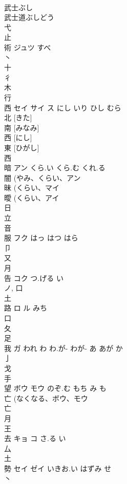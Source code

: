 \documentclass[8pt]{extreport}
\begin{document}
\begin{CJK}{UTF8}{min}
\\	武士ぶし
\\	武士道ぶしどう
\\	弋 
\\	止 
\\	術	ジュツ	すべ	
\\	丶 
\\	十 
\\	彳 
\\	木 
\\	行 
\\	西	セイ サイ ス	にし いり ひし むら	
\\	北 [きた] 
\\	南 [みなみ] 
\\	西 [にし] 
\\	東 [ひがし] 
\\	西 
\\	暗	アン	くら.い くら.む くれ.る	
\\	闇 (やみ、くらい、アン 
\\	昧 (くらい、マイ 
\\	曖 (くらい、アイ 
\\	日 
\\	立 
\\	音 
\\	服	フク	はっ はつ はら	
\\	卩 
\\	又 
\\	月 
\\	告	コク	つ.げる い	
\\	ノ, 口 
\\	土 
\\	路	ロ ル	みち	
\\	口 
\\	夂 
\\	足 
\\	我	ガ	われ わ わ.が- わが- あ あが か	
\\	亅 
\\	戈 
\\	手 
\\	望	ボウ モウ	のぞ.む もち み も	
\\	亡 (なくなる、ボウ、モウ 
\\	亡 
\\	月 
\\	王 
\\	去	キョ コ	さ.る い	
\\	厶 
\\	土 
\\	勢	セイ ゼイ	いきお.い はずみ せ	
\\	丶 

\end{CJK}
\end{document}
